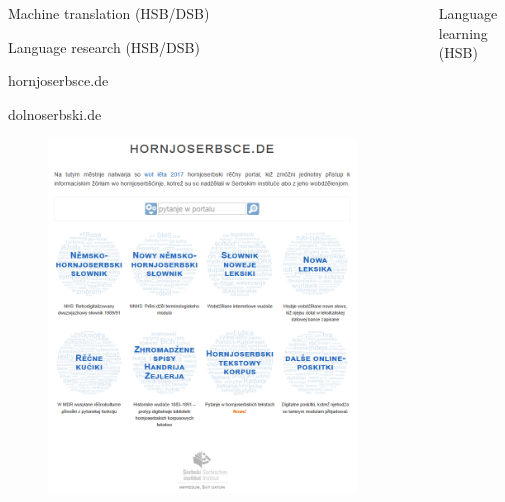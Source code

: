 \documentclass[final]{beamer}
\newlength{\sepwidth}
\newlength{\colwidth}
\newcommand{\separatorcolumn}{\begin{column}{\sepwidth}\end{column}}
\begin{document}
\begin{frame}[t]
\begin{columns}[t]
\begin{column}{\colwidth}
\begin{block}{Machine translation (HSB/DSB)}
  \end{block}

  \begin{block}{Language research (HSB/DSB)}  
  

    hornjoserbsce.de

    dolnoserbski.de

    \begin{figure}
        \centering
        \includegraphics[width=0.7\colwidth]{hornjoserbsce_gross.png}
        \label{fig:hornjoserbsce}
    \end{figure}

  \end{block}

\end{column}

\separatorcolumn

\begin{column}{\colwidth}

  \begin{block}{Language learning (HSB)}

    

\end{block}
\end{column}
\end{columns}
\end{frame}
\end{document}
